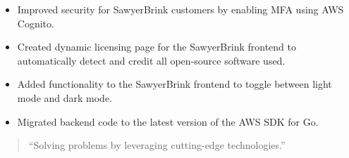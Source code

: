\documentclass[10pt,a4paper,ragged2e,withhyper]{altacv}
\begin{document}
\begin{paracol}{2}
\divider


\begin{itemize}
\item Improved security for SawyerBrink customers by enabling MFA using AWS Cognito.
\item Created dynamic licensing page for the SawyerBrink frontend to automatically detect and credit all open-source software used.
\item Added functionality to the SawyerBrink frontend to toggle between light mode and dark mode.
\item Migrated backend code to the latest version of the AWS SDK for Go.
\end{itemize}

\switchcolumn

\begin{quote}
``Solving problems by leveraging cutting-edge technologies.''
\end{quote}







\divider\smallskip





\medskip



\end{paracol}
\end{document}
